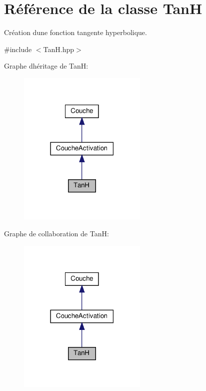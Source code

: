 \hypertarget{class_tan_h}{}\section{Référence de la classe TanH}
\label{class_tan_h}


Création d\textquotesingle{}une fonction tangente hyperbolique.  




{\ttfamily \#include $<$Tan\+H.\+hpp$>$}



Graphe d\textquotesingle{}héritage de TanH\+:\nopagebreak
\begin{figure}[H]
\begin{center}
\leavevmode
\includegraphics[width=174pt]{class_tan_h__inherit__graph}
\end{center}
\end{figure}


Graphe de collaboration de TanH\+:\nopagebreak
\begin{figure}[H]
\begin{center}
\leavevmode
\includegraphics[width=174pt]{class_tan_h__coll__graph}
\end{center}
\end{figure}
